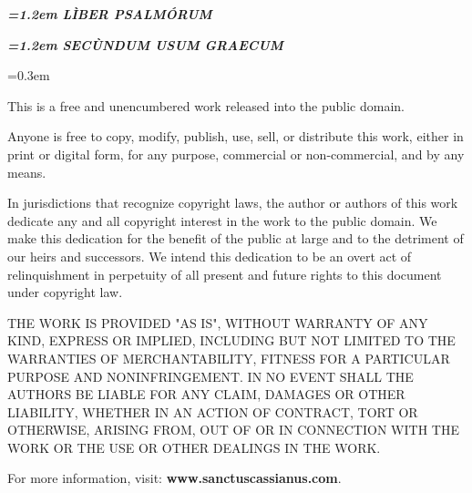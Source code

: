 \documentclass[twoside,10pt]{article}
\begin{document}
\pagestyle{empty}
{
  \begin{center}

  \vspace*{15em}

  {\bfseries\itshape\Huge{}\font=1.2em \uppercase{lìber psalmórum}}

  \vspace*{5em}

  {\bfseries\itshape\Large{}\font=1.2em \uppercase{secùndum usum graecum}}

  \vfill

  \end{center}
}

\newpage

{

\vspace*{5em}\font=0.3em

\noindent This is a free and unencumbered work released into the public domain.

\medskip

\noindent Anyone is free to copy, modify, publish, use, sell, or distribute this work, either in print or digital form, for any purpose, commercial or non-commercial, and by any means.

\medskip

\noindent In jurisdictions that recognize copyright laws, the author or authors of this work dedicate any and all copyright interest in the work to the public domain. We make this dedication for the benefit of the public at large and to the detriment of our heirs and successors. We intend this dedication to be an overt act of relinquishment in perpetuity of all present and future rights to this document under copyright law.

\medskip

\noindent THE WORK IS PROVIDED "AS IS", WITHOUT WARRANTY OF ANY KIND, EXPRESS OR IMPLIED, INCLUDING BUT NOT LIMITED TO THE WARRANTIES OF MERCHANTABILITY, FITNESS FOR A PARTICULAR PURPOSE AND NONINFRINGEMENT. IN NO EVENT SHALL THE AUTHORS BE LIABLE FOR ANY CLAIM, DAMAGES OR OTHER LIABILITY, WHETHER IN AN ACTION OF CONTRACT, TORT OR OTHERWISE, ARISING FROM, OUT OF OR IN CONNECTION WITH THE WORK OR THE USE OR OTHER DEALINGS IN THE WORK.

\bigskip

\noindent For more information, visit: \hspace{\parindent} {\bfseries www.sanctuscassianus.com}.

\vfill

}
\end{document}
